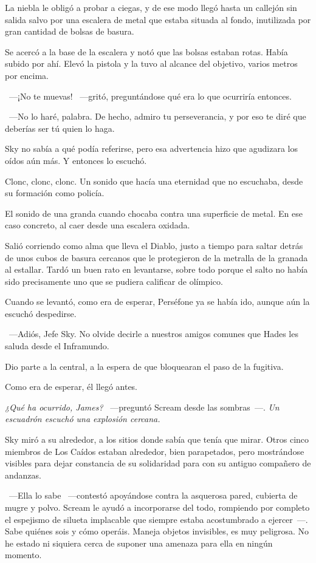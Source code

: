 La niebla le obligó a probar a ciegas, y de ese modo llegó hasta un callejón sin salida salvo por una escalera de metal que estaba situada al fondo, inutilizada por gran cantidad de bolsas de basura.

Se acercó a la base de la escalera y notó que las bolsas estaban rotas. Había subido por ahí. Elevó la pistola y la tuvo al alcance del objetivo, varios metros por encima.

~---¡No te muevas! ~---gritó, preguntándose qué era lo que ocurriría entonces.

~---No lo haré, palabra. De hecho, admiro tu perseverancia, y por eso te diré que deberías ser tú quien lo haga.

Sky no sabía a qué podía referirse, pero esa advertencia hizo que agudizara los oídos aún más. Y entonces lo escuchó.

Clonc, clonc, clonc. Un sonido que hacía una eternidad que no escuchaba, desde su formación como policía.

El sonido de una granda cuando chocaba contra una superficie de metal. En ese caso concreto, al caer desde una escalera oxidada.

Salió corriendo como alma que lleva el Diablo, justo a tiempo para saltar detrás de unos cubos de basura cercanos que le protegieron de la metralla de la granada al estallar. Tardó un buen rato en levantarse, sobre todo porque el salto no había sido precisamente uno que se pudiera calificar de olímpico.

Cuando se levantó, como era de esperar, Perséfone ya se había ido, aunque aún la escuchó despedirse.

~---Adiós, Jefe Sky. No olvide decirle a nuestros amigos comunes que Hades les saluda desde el Inframundo.

Dio parte a la central, a la espera de que bloquearan el paso de la fugitiva.

Como era de esperar, él llegó antes.

\emph{¿Qué ha ocurrido, James?} ~---preguntó Scream desde las sombras~---. \emph{Un escuadrón escuchó una explosión cercana.}

Sky miró a su alrededor, a los sitios donde sabía que tenía que mirar. Otros cinco miembros de Los Caídos estaban alrededor, bien parapetados, pero mostrándose visibles para dejar constancia de su solidaridad para con su antiguo compañero de andanzas.

~---Ella lo sabe ~---contestó apoyándose contra la asquerosa pared, cubierta de mugre y polvo. Scream le ayudó a incorporarse del todo, rompiendo por completo el espejismo de silueta implacable que siempre estaba acostumbrado a ejercer~---. Sabe quiénes sois y cómo operáis. Maneja objetos invisibles, es muy peligrosa. No he estado ni siquiera cerca de suponer una amenaza para ella en ningún momento.

